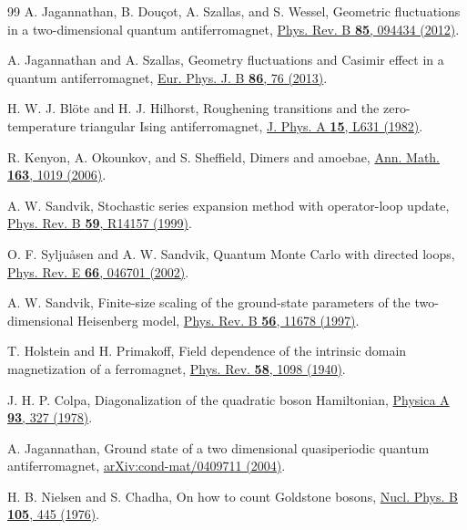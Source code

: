 \documentclass[prb,twocolumn,amsmath,amssymb,floatfix]{revtex4-2}
\begin{document}
\begin{thebibliography}{99}
 A. Jagannathan, B. Dou\c{c}ot, A. Szallas, and S. Wessel, Geometric fluctuations in a two-dimensional quantum antiferromagnet, \href{https://doi.org/10.1103/PhysRevB.85.094434}{Phys. Rev. B \textbf{85}, 094434 (2012)}.

 A. Jagannathan and A. Szallas, Geometry fluctuations and Casimir effect in a quantum antiferromagnet, \href{https://doi.org/10.1140/epjb/e2012-31033-y}{Eur. Phys. J. B \textbf{86}, 76 (2013)}.

 H. W. J. Bl\"ote and H. J. Hilhorst, Roughening transitions and the zero-temperature triangular Ising antiferromagnet, \href{https://doi.org/10.1088/0305-4470/15/11/011}{J. Phys. A \textbf{15}, L631 (1982)}.

 R. Kenyon, A. Okounkov, and S. Sheffield, Dimers and amoebae, \href{https://doi.org/10.4007/annals.2006.163.1019}{Ann. Math. \textbf{163}, 1019 (2006)}.

 A. W. Sandvik, Stochastic series expansion method with operator-loop update, \href{https://doi.org/10.1103/PhysRevB.59.R14157}{Phys. Rev. B \textbf{59}, R14157 (1999)}.

 O. F. Sylju\aa sen and A. W. Sandvik, Quantum Monte Carlo with directed loops, \href{https://doi.org/10.1103/PhysRevE.66.046701}{Phys. Rev. E \textbf{66}, 046701 (2002)}.

 A. W. Sandvik, Finite-size scaling of the ground-state parameters of the two-dimensional Heisenberg model, \href{https://doi.org/10.1103/PhysRevB.56.11678}{Phys. Rev. B \textbf{56}, 11678 (1997)}.

 T. Holstein and H. Primakoff, Field dependence of the intrinsic domain magnetization of a ferromagnet, \href{https://doi.org/10.1103/PhysRev.58.1098}{Phys. Rev. \textbf{58}, 1098 (1940)}.

 J. H. P. Colpa, Diagonalization of the quadratic boson Hamiltonian, \href{https://doi.org/10.1016/0378-4371(78)90160-7}{Physica A \textbf{93}, 327 (1978)}.

 A. Jagannathan, Ground state of a two dimensional quasiperiodic quantum antiferromagnet, \href{https://arxiv.org/abs/cond-mat/0409711}{arXiv:cond-mat/0409711 (2004)}.

 H. B. Nielsen and S. Chadha, On how to count Goldstone bosons, \href{https://doi.org/10.1016/0550-3213(76)90025-0}{Nucl. Phys. B \textbf{105}, 445 (1976)}.


\end{thebibliography}
\end{document}
